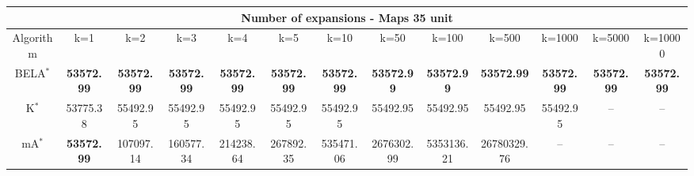 \begin{tabular}{c|cccccccccccc}\toprule
\multicolumn{13}{c}{Number of expansions - Maps 35 unit}\\ \midrule
Algorithm & k=1 & k=2 & k=3 & k=4 & k=5 & k=10 & k=50 & k=100 & k=500 & k=1000 & k=5000 & k=10000 \\ \midrule
BELA$^*$ & \textbf{53572.99} & \textbf{53572.99} & \textbf{53572.99} & \textbf{53572.99} & \textbf{53572.99} & \textbf{53572.99} & \textbf{53572.99} & \textbf{53572.99} & \textbf{53572.99} & \textbf{53572.99} & \textbf{53572.99} & \textbf{53572.99} \\
K$^*$ & 53775.38 & 55492.95 & 55492.95 & 55492.95 & 55492.95 & 55492.95 & 55492.95 & 55492.95 & 55492.95 & 55492.95 & -- & -- \\
mA$^*$ & \textbf{53572.99} & 107097.14 & 160577.34 & 214238.64 & 267892.35 & 535471.06 & 2676302.99 & 5353136.21 & 26780329.76 & -- & -- & -- \\ \bottomrule 
\end{tabular}
